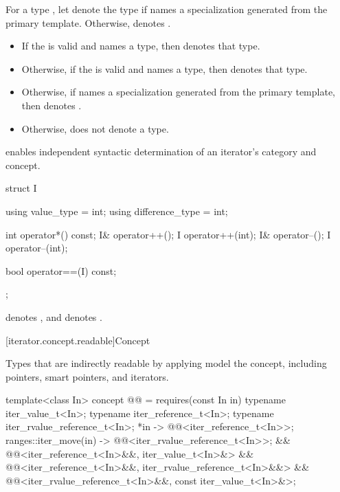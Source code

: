 \pnum
For a type , let  denote
the type  if  names
a specialization generated from the primary template.
Otherwise,  denotes
.
\begin{itemize}
\item If the 
   is valid
  and names a type, then  denotes that
  type.
\item Otherwise, if the 
  is valid and names a type, then 
  denotes that type.
\item Otherwise, if  names a specialization generated
  from the primary template, then 
  denotes .
\item Otherwise,  does not denote a type.
\end{itemize}

\pnum
\begin{note}
 enables independent syntactic determination
of an iterator's category and concept.
\end{note}
\begin{example}
\begin{codeblock}
struct I {
  using value_type = int;
  using difference_type = int;

  int operator*() const;
  I& operator++();
  I operator++(int);
  I& operator--();
  I operator--(int);

  bool operator==(I) const;
};
\end{codeblock}
 denotes ,
and  denotes .
\end{example}

[iterator.concept.readable]{Concept }

\pnum
Types that are indirectly readable by applying 
model the  concept, including
pointers, smart pointers, and iterators.

\begin{codeblock}
template<class In>
  concept @@ =
    requires(const In in) {
      typename iter_value_t<In>;
      typename iter_reference_t<In>;
      typename iter_rvalue_reference_t<In>;
      { *in } -> @@<iter_reference_t<In>>;
      { ranges::iter_move(in) } -> @@<iter_rvalue_reference_t<In>>;
    } &&
    @@<iter_reference_t<In>&&, iter_value_t<In>&> &&
    @@<iter_reference_t<In>&&, iter_rvalue_reference_t<In>&&> &&
    @@<iter_rvalue_reference_t<In>&&, const iter_value_t<In>&>;
\end{codeblock}

